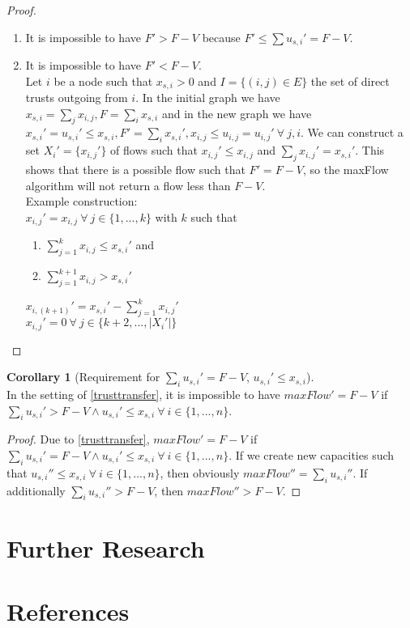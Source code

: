 \documentclass[11pt]{article}
\theoremstyle{definition}
\theoremstyle{corollary}
\newtheorem{corollary}{Corollary}[section]
\begin{document}
    \begin{proof} \
       \begin{enumerate}
         \item  It is impossible to have $F' > F - V$ because $F' \leq \sum{u_{s, i}'} = F - V$.
         \item  It is impossible to have $F' < F - V$. \\
         Let $i$ be a node such that $x_{s, i} > 0$ and $I = \{(i,j) \in E\}$ the set of direct trusts outgoing from $i$.
         In the initial graph we have $x_{s, i} = \sum_{j}{x_{i, j}}, F = \sum_{i}{x_{s, i}}$
         and in the new graph we have $x_{s, i}' = u_{s, i}' \leq x_{s, i},
         F' = \sum_{i}{x_{s, i}'}, x_{i, j} \leq u_{i, j} = u_{i, j}' \:\forall\: j, i$.
         We can construct a set $X_i' = \{x_{i, j}'\}$ of flows such that $x_{i, j}' \leq x_{i, j}$
         and $\sum_{j}{x_{i, j}'} = x_{s, i}'$. This shows that there is a possible flow such that $F' = F - V$,
         so the maxFlow algorithm will not return a flow less than $F - V$. \\
         Example construction: \\
         $x_{i, j}' = x_{i, j} \:\forall \:j \in \{1,...,k\}$ with $k$ such that
            \begin{enumerate}
	      \item $\sum_{j=1}^{k}{x_{i, j}} \leq x_{s, i}'$ and
	      \item $\sum_{j=1}^{k+1}{x_{i, j}} > x_{s, i}'$
            \end{enumerate}
         $x_{i, (k+1)}' = x_{s, i}' - \sum_{j=1}^{k}{x_{i, j}'}$ \\
         $x_{i, j}' = 0 \:\forall \:j \in \{k+2,...,|X_i'|\}$
       \end{enumerate}
    \end{proof}

    \begin{corollary}[Requirement for $\sum_{i}{u_{s, i}'} = F - V$, $u_{s, i}' \leq x_{s, i}$] \ \\
       In the setting of \ref{trusttransfer}, it is impossible to have $maxFlow' = F - V$ if $\sum_{i}{u_{s, i}'} > F - V
       \wedge u_{s, i}' \leq x_{s, i}\: \forall \:i \in \{1,...,n\}$.
    \end{corollary}
    \begin{proof}
       Due to \ref{trusttransfer}, $maxFlow' = F - V$ if $\sum_{i}{u_{s, i}'} = F - V
       \wedge u_{s, i}' \leq x_{s, i}\: \forall \:i \in \{1,...,n\}$. If we create new capacities such that
       $u_{s,i}'' \leq x_{s,i}\:\forall\:i \in \{1,...,n\}$, then obviously $maxFlow'' = \sum_{i}{u_{s,i}''}$. If
       additionally $\sum_{i}{u_{s,i}''} > F - V$, then $maxFlow'' > F - V$.
    \end{proof}

  \section{Further Research}

  \section{References}
\end{document}
